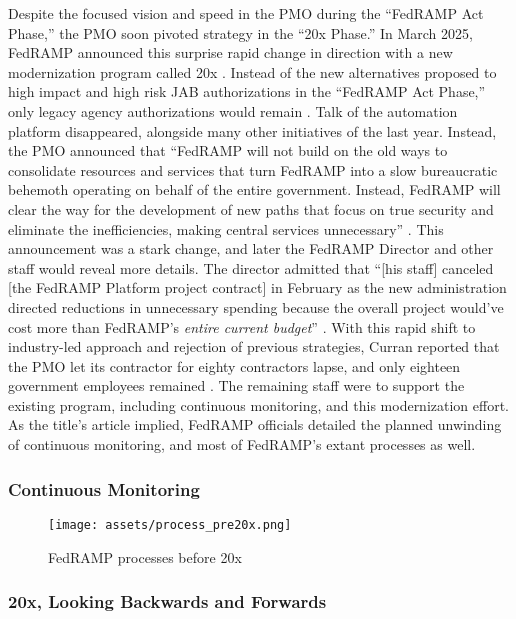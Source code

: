 \documentclass{jdf}
\begin{document}
Despite the focused vision and speed in the PMO during the ``FedRAMP Act Phase,'' the PMO soon pivoted strategy in the ``20x Phase.'' In March 2025, FedRAMP announced this surprise rapid change in direction with a new modernization program called 20x \citeyear{fedramp_blog_20x}. Instead of the new alternatives proposed to high impact and high risk JAB authorizations in the ``FedRAMP Act Phase,'' only legacy agency authorizations would remain \citeyear{fedramp_blog_20x}. Talk of the automation platform disappeared, alongside many other initiatives of the last year. Instead, the PMO announced that ``FedRAMP will not build on the old ways to consolidate resources and services that turn FedRAMP into a slow bureaucratic behemoth operating on behalf of the entire government. Instead, FedRAMP will clear the way for the development of new paths that focus on true security and eliminate the inefficiencies, making central services unnecessary'' \citeyear{fedramp_blog_20x}. This announcement was a stark change, and later the FedRAMP Director and other staff would reveal more details. The director admitted that ``[his staff] canceled [the FedRAMP Platform project contract] in February as the new administration directed reductions in unnecessary spending because the overall project would've cost more than FedRAMP's \textit{entire current budget}'' \citeyear{20x_waterman_platform_comment}. With this rapid shift to industry-led approach and rejection of previous strategies, Curran reported that the PMO let its contractor for eighty contractors lapse, and only eighteen government employees remained \citeyear{curran25}. The remaining staff were to support the existing program, including continuous monitoring, and this modernization effort. As the title's article implied, FedRAMP officials detailed the planned unwinding of continuous monitoring, and most of FedRAMP's extant processes as well.

\subsubsection{Continuous Monitoring} \label{conmon}

\begin{figure}[h!]
\centering
\texttt{[image: assets/process\_pre20x.png]}
\caption{FedRAMP processes before 20x}
\label{fig:conmon1}
\end{figure}

\subsubsection{20x, Looking Backwards and Forwards} \label{20x}
\end{document}
